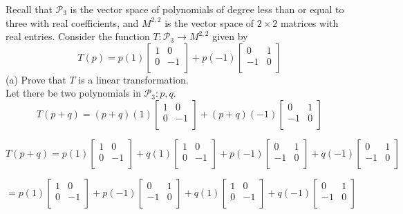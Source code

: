\documentclass[12pt]{article}
\begin{document}
Recall that $\mathcal{P}_3$ is the vector space of polynomials of degree less than or equal to three with real coefficients, and $M^{2,2}$ is the vector space of $2\times 2$ matrices with real entries. Consider the function $T:\mathcal{P}_3 \rightarrow M^{2,2}$ given by
$$
T(p)=p(1)
\begin{bmatrix}
	1 & 0 \\
	0 & -1 \\
\end{bmatrix}
+
p(-1)
\begin{bmatrix}
	0 & 1 \\
	-1 & 0 \\
\end{bmatrix}
$$
(a) Prove that $T$ is a linear transformation.\\
\medskip
Let there be two polynomials in $\mathcal{P}_3: p, q$.\\
$$
T(p+q)=
(p+q)(1)
\begin{bmatrix}
	1 & 0 \\
	0 & -1 \\
\end{bmatrix}
+
(p+q)(-1)
\begin{bmatrix}
	0 & 1 \\
	-1 & 0 \\
\end{bmatrix}
$$

$$
T(p+q)=
p(1)
\begin{bmatrix}
	1 & 0 \\
	0 & -1 \\
\end{bmatrix}
+
q(1)
\begin{bmatrix}
	1 & 0 \\
	0 & -1 \\
\end{bmatrix}
+
p(-1)
\begin{bmatrix}
	0 & 1 \\
	-1 & 0 \\
\end{bmatrix}
+
q(-1)
\begin{bmatrix}
	0 & 1 \\
	-1 & 0 \\
\end{bmatrix}
$$

$$
=
p(1)
\begin{bmatrix}
	1 & 0 \\
	0 & -1 \\
\end{bmatrix}
+
p(-1)
\begin{bmatrix}
	0 & 1 \\
	-1 & 0 \\
\end{bmatrix}
+
q(1)
\begin{bmatrix}
	1 & 0 \\
	0 & -1 \\
\end{bmatrix}
+
q(-1)
\begin{bmatrix}
	0 & 1 \\
	-1 & 0 \\
\end{bmatrix}
$$
\end{document}
